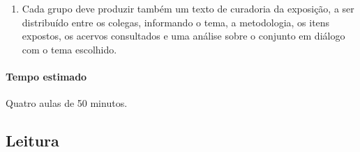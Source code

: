 \documentclass[12pt]{extarticle}
\begin{document}
\begin{enumerate}
\item Cada grupo deve produzir também um texto de curadoria da exposição, a
ser distribuído entre os colegas, informando o tema, a metodologia, os
itens expostos, os acervos consultados e uma análise sobre o conjunto em
diálogo com o tema escolhido.
\end{enumerate}

\paragraph{Tempo estimado} Quatro aulas de 50 minutos.

\subsection{Leitura}

%
%
%
%
%
%
\end{document}
